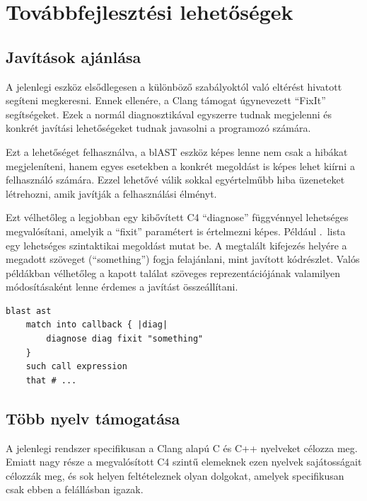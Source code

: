 \chapter{Továbbfejlesztési lehetőségek}

\section{Javítások ajánlása}

A jelenlegi eszköz elsődlegesen a különböző szabályoktól való eltérést hivatott segíteni megkeresni.
Ennek ellenére, a Clang támogat úgynevezett ``FixIt'' segítségeket.
Ezek a normál diagnosztikával egyszerre tudnak megjelenni és konkrét javítási lehetőségeket tudnak javasolni a programozó számára.

Ezt a lehetőséget felhasználva, a blAST eszköz képes lenne nem csak a hibákat megjeleníteni, hanem egyes esetekben a konkrét megoldást is képes lehet kiírni a felhasználó számára.
Ezzel lehetővé válik sokkal egyértelműbb hiba üzeneteket létrehozni, amik javítják a felhasználási élményt.

Ezt vélhetőleg a legjobban egy kibővített C4 ``diagnose'' függvénnyel lehetséges megvalósítani, amelyik a ``fixit'' paramétert is értelmezni képes.
Például .~lista egy lehetséges szintaktikai megoldást mutat be.
A megtalált kifejezés helyére a megadott szöveget (``something'') fogja felajánlani, mint javított kódrészlet.
Valós példákban vélhetőleg a kapott találat szöveges reprezentációjának valamilyen módosításaként lenne érdemes a javítást összeállítani.

\begin{lstlisting}[label=lst:blast-fixit,caption={FixIt segítségek blAST-al}]
blast ast
	match into callback { |diag|
		diagnose diag fixit "something"
	}
	such call expression
	that # ...
\end{lstlisting}

\section{Több nyelv támogatása}

A jelenlegi rendszer specifikusan a Clang alapú C és C++ nyelveket célozza meg.
Emiatt nagy része a megvalósított C4 szintű elemeknek ezen nyelvek sajátosságait célozzák meg, és sok helyen feltételeznek olyan dolgokat, amelyek specifikusan csak ebben a felállásban igazak.

